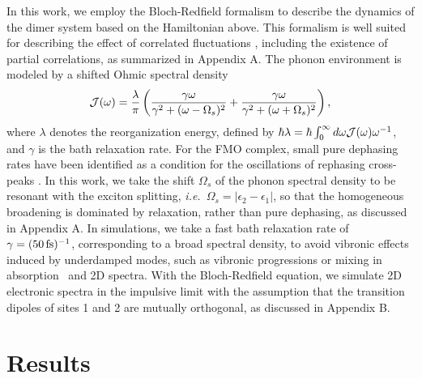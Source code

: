 \documentclass[%
 reprint,%
 amssymb, amsmath,%
 aip,cha,%
]{revtex4-1}
\begin{document}
In this work, we employ the Bloch-Redfield formalism \cite{JeskeJCP2015,JeskePRA2013} to describe the dynamics of the dimer system based on the Hamiltonian above. This formalism is well suited for describing the effect of correlated fluctuations \cite{JeskeJCP2015}, including the existence of partial correlations, as summarized in Appendix A. The phonon environment is modeled by a shifted Ohmic spectral density \cite{KreisbeckJPCL2012}
\begin{equation}
{\cal J}(\omega)=\frac{\lambda}{\pi}\left(\frac{\gamma\omega}{\gamma^2+(\omega-\Omega_s)^{2}}+\frac{\gamma\omega}{\gamma^2+(\omega+\Omega_s)^{2}}\right),
\label{eq:spec}
\end{equation}
where $\lambda$ denotes the reorganization energy, defined by $\hbar\lambda=\hbar\int_{0}^{\infty}d\omega{\cal J}(\omega)\omega^{-1}$, and $\gamma$ is the bath relaxation rate. For the FMO complex, small pure dephasing rates have been identified as a condition for the oscillations of rephasing cross-peaks \cite{KreisbeckJPCL2012}. In this work, we take the shift $\Omega_s$ of the phonon spectral density to be resonant with the exciton splitting, {\it i.e.}~$\Omega_s = \left|\epsilon_2-\epsilon_1\right|$, so that the homogeneous broadening is dominated by relaxation, rather than pure dephasing, as discussed in Appendix A. In simulations, we take a fast bath relaxation rate of $\gamma=(50\,{\rm fs})^{-1}$, corresponding to a broad spectral density, to avoid vibronic effects induced by underdamped modes, such as vibronic progressions or mixing in absorption~\cite{GelzinisJCP2015} and 2D spectra. With the Bloch-Redfield equation, we simulate 2D electronic spectra in the impulsive limit with the assumption that the transition dipoles of sites 1 and 2 are mutually orthogonal, as discussed in Appendix B.


\section{Results}
\end{document}
